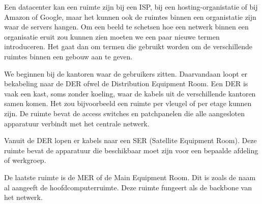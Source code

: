 Een datacenter kan een ruimte zijn bij een ISP, bij een hosting-organistatie of bij Amazon of Google, maar het kunnen ook de ruimtes binnen een organistatie zijn waar de servers hangen. Om een beeld te schetsen hoe een netwerk binnen een organisatie eruit zou kunnen zien moeten we een paar nieuwe termen introduceren. Het gaat dan om termen die gebruikt worden om de verschillende ruimtes binnen een gebouw aan te geven.

We beginnen bij de kantoren waar de gebruikers zitten. Daarvandaan loopt er bekabeling naar de DER ofwel de Distribution Equipment Room. Een DER is vaak een kast, soms zonder koeling, waar de kabels uit de verschillende kantoren samen komen. Het zou bijvoorbeeld een ruimte per vleugel of per etage kunnen zijn. De ruimte bevat de access switches en patchpanelen die alle aangesloten apparatuur verbindt met het centrale netwerk.

Vanuit de DER lopen er kabels naar een SER (Satellite Equipment Room). Deze ruimte bevat de apparatuur die beschikbaar moet zijn voor een bepaalde afdeling of werkgroep.

De laatste ruimte is de MER of de Main Equipment Room. Dit is zoals de naam al aangeeft de hoofdcomputerruimte. Deze ruimte fungeert als de backbone van het netwerk.
